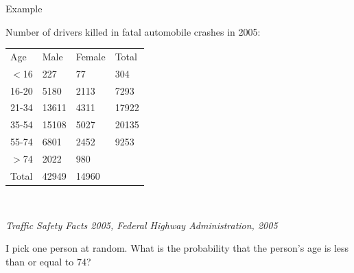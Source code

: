 \begin{frame}{Example}

  Number of drivers killed in fatal automobile crashes in 2005: \\
  \begin{tabular}{llll}
    Age & Male & Female & Total \\
    $<$16 & 227 & 77 & 304 \\
    16-20 & 5180 & 2113 & 7293 \\
    21-34 & 13611 & 4311 & 17922 \\
    35-54 & 15108 & 5027 & 20135 \\
    55-74 & 6801 & 2452 & 9253 \\
    $>$74   & 2022 & 980 & \color{green}{3002} \\
    Total & 42949 & 14960 & \color{green}{57909}
  \end{tabular} \\

  \vfill

  \textit{Traffic Safety Facts 2005, Federal Highway Administration,
    2005}

  \vfill

  I pick one person at random. What is the probability that the person's
  age is less than or equal to 74?

  
  
\end{frame}


